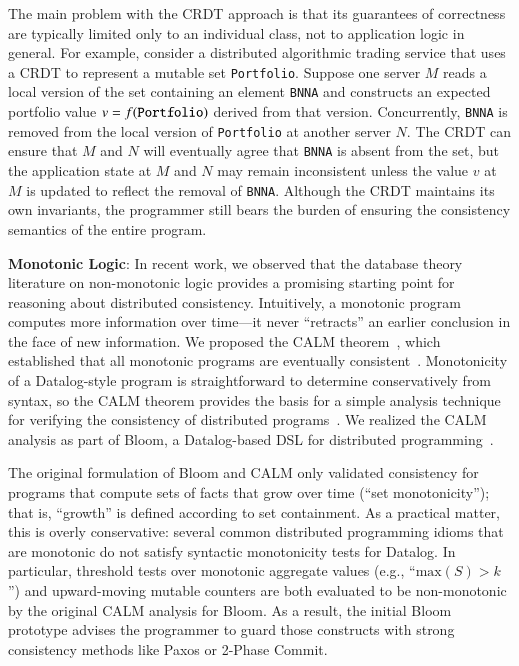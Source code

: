 The main problem with the CRDT approach is that its guarantees of correctness are typically limited only to an individual class, not to application logic in general. For example, consider a distributed algorithmic trading service that uses a CRDT to represent a mutable set \texttt{Portfolio}. Suppose one server $M$ reads a local version of the set containing an element \texttt{BNNA} and constructs an expected portfolio value $v = f(\mbox{\texttt{Portfolio}})$ derived from that version. Concurrently, \texttt{BNNA} is removed from the local version of \texttt{Portfolio} at another server $N$. The CRDT can ensure that $M$ and $N$ will eventually agree that \texttt{BNNA} is absent from the set, but the application state at $M$ and $N$ may remain inconsistent unless the value $v$ at $M$ is updated to reflect the removal of \texttt{BNNA}. Although the CRDT maintains its own invariants, the programmer still bears the burden of ensuring the consistency semantics of the entire program.

\vspace{0.5em}
\noindent \textbf{Monotonic Logic}: In recent work, we observed that the database theory literature on non-monotonic logic provides a promising starting point for reasoning about distributed consistency. Intuitively, a monotonic program computes more information over time---it never ``retracts'' an earlier conclusion in the face of new information. We proposed the CALM theorem~\cite{Hellerstein2010}, which established that all monotonic programs are eventually consistent~\cite{Ameloot2011}. Monotonicity of a Datalog-style program is straightforward to determine conservatively from syntax, so the CALM theorem provides the basis for a simple analysis technique for verifying the consistency of distributed programs~\cite{Alvaro2011}. We realized the CALM analysis as part of Bloom, a Datalog-based DSL for distributed programming~\cite{bloom}.

The original formulation of Bloom and CALM only validated consistency for programs that compute sets of facts that grow over time (``set monotonicity''); that is, ``growth'' is defined according to set containment. As a practical matter, this is overly conservative: several common distributed programming idioms that are monotonic do not satisfy syntactic monotonicity tests for Datalog. In particular, threshold tests over monotonic aggregate values (e.g., ``$\textrm{max}(S) > k$'') and upward-moving mutable counters are both evaluated to be non-monotonic by the original CALM analysis for Bloom.  As a result, the initial Bloom prototype advises the programmer to guard those constructs with strong consistency methods like Paxos or 2-Phase Commit. 

